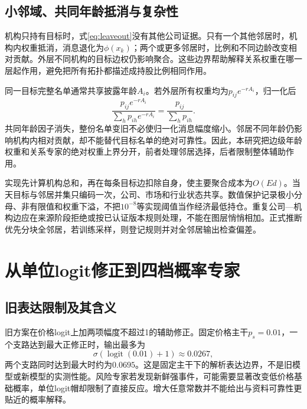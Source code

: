 \subsection{小邻域、共同年龄抵消与复杂性}
机构只持有目标时，式\eqref{eq:leaveout}没有其他公司证据。只有一个其他邻居时，机构内权重抵消，消息退化为$\phi(x_k)$；两个或更多邻居时，比例和不同边龄改变相对贡献。外层不同机构的目标边权仍影响聚合。这些边界帮助解释关系权重在哪一层起作用，避免把所有拓扑都描述成持股比例相同作用。


同一目标完整名单通常共享披露年龄$A_i$。若外层所有权重均为$p_{ij}e^{-rA_i}$，归一化后
\begin{equation}
 \frac{p_{ij}e^{-rA_i}}{\sum_h p_{ih}e^{-rA_i}}
 =\frac{p_{ij}}{\sum_h p_{ih}}.
\end{equation}
共同年龄因子消失，整份名单变旧不必使归一化消息幅度缩小。邻居不同年龄仍影响机构内相对贡献，却不能替代目标名单的绝对可靠性。因此，本研究把边级年龄权重和关系专家的绝对权重上界分开，前者处理邻居选择，后者限制整体辅助作用。

实现先计算机构总和，再在每条目标边扣除自身，使主要聚合成本为$O(Ed)$。当天目标与邻居并集只编码一次，公司、市场和行业状态共享。数值保护记录极小分母、非有限值和权重下溢，不把$10^{-8}$等实现阈值当作经济最低持仓。重复公司—机构边应在来源阶段拒绝或按已认证版本规则处理，不能在图层悄悄相加。正式推断优先分块全邻居，若训练采样，则登记规则并对全邻居输出检查偏差。

\section{从单位logit修正到四档概率专家}
\subsection{旧表达限制及其含义}
旧方案在价格logit上加两项幅度不超过1的辅助修正。固定价格主干$p_s=0.01$，一个支路达到最大正修正时，输出最多为
\begin{equation}
 \sigma(\operatorname{logit}(0.01)+1)\approx0.0267,
\end{equation}
两个支路同时达到最大时约为$0.0695$。这是固定主干下的解析表达边界，不是旧模型或新模型的实测性能。风险专家若发现新鲜强事件，可能需要显著改变低价格基础概率，单位logit帽却限制了直接反应。增大任意常数并不能给出与资料可靠性更贴近的概率解释。

